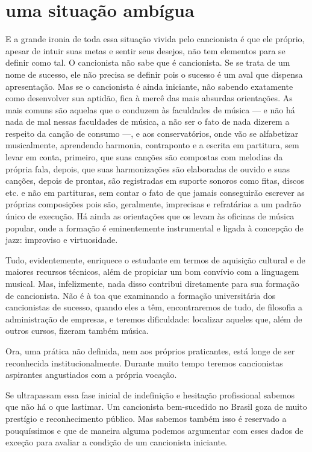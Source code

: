 \section{uma situação ambígua}

E a grande ironia de toda essa situação vivida pelo cancionista é que
ele próprio, apesar de intuir suas metas e sentir seus desejos, não tem
elementos para se definir como tal. O cancionista não sabe que é
cancionista. Se se trata de um nome de sucesso, ele não precisa se
definir pois o sucesso é um aval que dispensa apresentação. Mas se o
cancionista é ainda iniciante, não sabendo exatamente como desenvolver
sua aptidão, fica à mercê das mais absurdas orientações. As mais comuns
são aquelas que o conduzem às faculdades de música --- e não há nada de mal
nessas faculdades de música, a não ser o fato de nada dizerem a respeito
da canção de consumo ---, e aos conservatórios, onde vão se alfabetizar
musicalmente, aprendendo harmonia, contraponto e a escrita em partitura,
sem levar em conta, primeiro, que suas canções são compostas com melodias da
própria fala, depois, que suas harmonizações são elaboradas de ouvido e suas
canções, depois de prontas, são registradas em suporte sonoros como fitas,
discos etc. e não em partituras, sem contar o fato de que jamais
conseguirão escrever as próprias composições pois são, geralmente,
imprecisas e refratárias a um padrão único de execução. Há ainda as orientações que
os levam às
oficinas de música popular, onde a formação é eminentemente
instrumental e ligada à concepção de jazz: improviso e virtuosidade.

Tudo, evidentemente, enriquece o estudante em termos de aquisição
cultural e de maiores recursos técnicos, além de propiciar um bom
convívio com a linguagem musical. Mas, infelizmente, nada disso
contribui diretamente para sua formação de cancionista. Não é à toa que
examinando a formação universitária dos cancionistas de sucesso, quando
eles a têm, encontraremos de tudo, de filosofia a administração de
empresas, e teremos dificuldade: localizar aqueles que, além de outros
cursos, fizeram também música.

Ora, uma prática não definida, nem aos próprios praticantes, está
longe de ser reconhecida institucionalmente. Durante muito tempo
teremos cancionistas aspirantes angustiados com a própria vocação.

Se ultrapassam essa fase inicial de indefinição e hesitação profissional
sabemos que não há o que lastimar. Um cancionista bem-sucedido no Brasil
goza de muito prestígio e reconhecimento público. Mas sabemos também
isso é reservado a pouquíssimos e que de maneira alguma podemos
argumentar com esses dados de exceção para avaliar a condição de um
cancionista iniciante.

